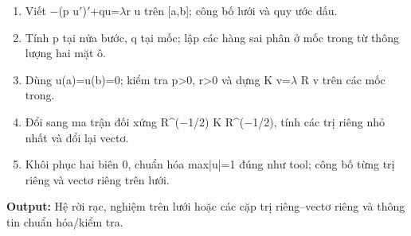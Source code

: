 \begin{enumerate}

\item Viết \ensuremath{-}(\allowbreak{}p u\ensuremath{\prime})\ensuremath{\prime}+\allowbreak{}qu=\allowbreak{}\ensuremath{\lambda}r u trên [a,\allowbreak{}b];\allowbreak{} công bố lưới và quy ước dấu.

\item Tính p tại nửa bước,\allowbreak{} q tại mốc;\allowbreak{} lập các hàng sai phân ở mốc trong từ thông lượng hai mặt ô.

\item Dùng u(\allowbreak{}a)=\allowbreak{}u(\allowbreak{}b)=\allowbreak{}0;\allowbreak{} kiểm tra p>0,\allowbreak{} r>0 và dựng K v=\allowbreak{}\ensuremath{\lambda} R v trên các mốc trong.

\item Đổi sang ma trận đối xứng R\textasciicircum{}(\allowbreak{}\ensuremath{-}1/\allowbreak{}2) K R\textasciicircum{}(\allowbreak{}\ensuremath{-}1/\allowbreak{}2),\allowbreak{} tính các trị riêng nhỏ nhất và đổi lại vectơ.

\item Khôi phục hai biên 0,\allowbreak{} chuẩn hóa max|u|=\allowbreak{}1 đúng như tool;\allowbreak{} công bố từng trị riêng và vectơ riêng trên lưới.

\end{enumerate}

\textbf{Output:} Hệ rời rạc,\allowbreak{} nghiệm trên lưới hoặc các cặp trị riêng–vectơ riêng và thông tin chuẩn hóa/\allowbreak{}kiểm tra.
